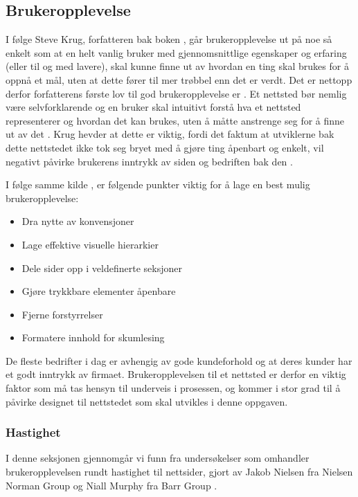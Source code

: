 \subsection{Brukeropplevelse}
\label{sec:ux}
I følge Steve Krug, forfatteren bak boken , går brukeropplevelse ut på noe så enkelt som at en helt vanlig bruker med gjennomsnittlige egenskaper og erfaring (eller til og med lavere), skal kunne finne ut av hvordan en ting skal brukes for å oppnå et mål, uten at dette fører til mer trøbbel enn det er verdt.
Det er nettopp derfor forfatterens første lov til god brukeropplevelse er . Et nettsted bør nemlig være selvforklarende og en bruker skal intuitivt forstå hva et nettsted representerer og hvordan det kan brukes, uten å måtte anstrenge seg for å finne ut av det \cite[s.~11]{krug2014dmt}.
Krug hevder at dette er viktig, fordi det faktum at utviklerne bak dette nettstedet ikke tok seg bryet med å gjøre ting åpenbart og enkelt, vil negativt påvirke brukerens inntrykk av siden og bedriften bak den \cite[s.~15]{krug2014dmt}.

I følge samme kilde \cite[s.~29]{krug2014dmt}, er følgende punkter viktig for å lage en best mulig brukeropplevelse:
\begin{itemize}
    \item Dra nytte av konvensjoner
    \item Lage effektive visuelle hierarkier
    \item Dele sider opp i veldefinerte seksjoner
    \item Gjøre trykkbare elementer åpenbare
    \item Fjerne forstyrrelser
    \item Formatere innhold for skumlesing
\end{itemize}

De fleste bedrifter i dag er avhengig av gode kundeforhold og at deres kunder har et godt inntrykk av firmaet. Brukeropplevelsen til et nettsted er derfor en viktig faktor som må tas hensyn til underveis i prosessen, og kommer i stor grad til å påvirke designet til nettstedet som skal utvikles i denne oppgaven.

\subsubsection{Hastighet}
I denne seksjonen gjennomgår vi funn fra undersøkelser som omhandler brukeropplevelsen rundt hastighet til nettsider, gjort av Jakob Nielsen fra Nielsen Norman Group \cite{nngroupWebsiteResponseTimes} og Niall Murphy fra Barr Group \cite{barrgroupReponseTimingUI}. 

